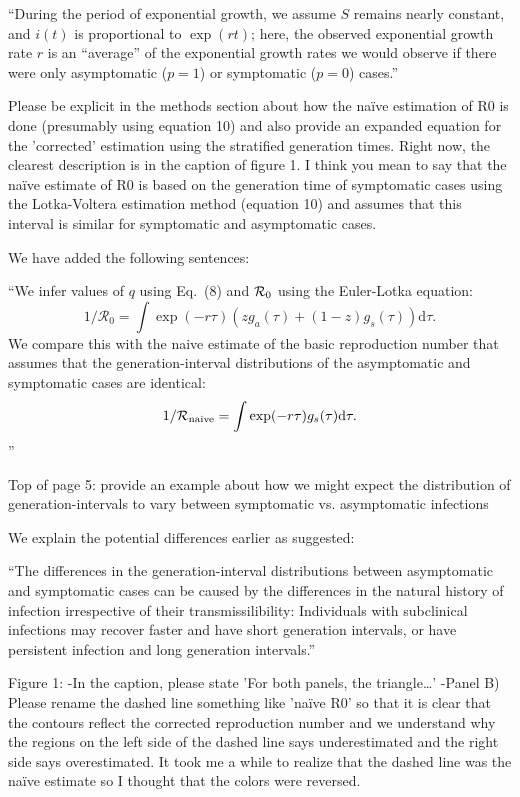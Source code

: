 \documentclass[12pt]{article}
\newcommand{\revtext}{\textsf}
\begin{document}
``During the period of exponential growth, we assume $S$ remains nearly constant, and $i(t)$ is proportional to $\exp(r t)$;
here, the observed exponential growth rate $r$ is an ``average'' of the exponential growth rates we would observe if there were only asymptomatic ($p=1$) or symptomatic ($p=0$) cases.''

\revtext{Please be explicit in the methods section about how the naïve estimation of R0 is done (presumably using equation 10) and also provide an expanded equation for the 'corrected' estimation using the stratified generation times. Right now, the clearest description is in the caption of figure 1.  I think you mean to say that the naïve estimate of R0 is based on the generation time of symptomatic cases using the Lotka-Voltera estimation method (equation 10) and assumes that this interval is similar for symptomatic and asymptomatic cases.}

We have added the following sentences:

``We infer values of $q$ using Eq.~(8) and ${\cal{R}}_0$ using the Euler-Lotka equation:
\begin{equation}
1/\mathcal R_0 = \int \exp(-r \tau) \left(z g_a(\tau) + (1-z) g_s(\tau)\right) \mathrm{d} \tau.
\end{equation}
We compare this with the naive estimate of the basic reproduction number that assumes that the generation-interval distributions of the asymptomatic and symptomatic cases are identical:
\begin{equation}
1/\mathcal R_{\tiny \textrm{naive}} = \int \exp(-r \tau) g_s(\tau) \mathrm{d} \tau.
\end{equation}''

\revtext{Top of page 5: provide an example about how we might expect the distribution of generation-intervals to vary between symptomatic vs. asymptomatic infections}

We explain the potential differences earlier as suggested:

``The differences in the generation-interval distributions between asymptomatic and symptomatic cases can be caused by the differences in the natural history of infection irrespective of their transmissilibility:
Individuals with subclinical infections may recover faster and have short generation intervals, or have persistent infection and long generation intervals.''

\revtext{Figure 1:
-In the caption, please state 'For both panels, the triangle…'
-Panel B) Please rename the dashed line something like 'naïve R0' so that it is clear that the contours reflect the corrected reproduction number and we understand why the regions on the left side of the dashed line says underestimated and the right side says overestimated.  It took me a while to realize that the dashed line was the naïve estimate so I thought that the colors were reversed.}
\end{document}
